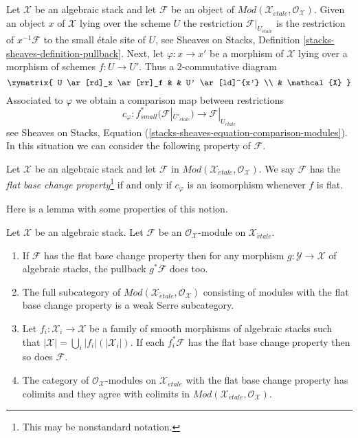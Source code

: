 \noindent
Let $\mathcal{X}$ be an algebraic stack and let $\mathcal{F}$ be an object
of $\textit{Mod}(\mathcal{X}_{\acute{e}tale}, \mathcal{O}_\mathcal{X})$.
Given an object $x$ of $\mathcal{X}$ lying over the scheme $U$ the
restriction $\mathcal{F}|_{U_{\acute{e}tale}}$ is the restriction of
$x^{-1}\mathcal{F}$ to the small \'etale site of $U$, see
Sheaves on Stacks, Definition \ref{stacks-sheaves-definition-pullback}.
Next, let $\varphi : x \to x'$ be a morphism of $\mathcal{X}$ lying
over a morphism of schemes $f : U \to U'$. Thus a $2$-commutative diagram
$$
\xymatrix{
U \ar[rd]_x \ar[rr]_f & & U' \ar[ld]^{x'} \\
& \mathcal{X}
}
$$
Associated to $\varphi$ we obtain a comparison map between restrictions
\begin{equation}
\label{equation-comparison-modules}
c_\varphi :
f_{small}^*(\mathcal{F}|_{U'_{\acute{e}tale}})
\longrightarrow
\mathcal{F}|_{U_{\acute{e}tale}}
\end{equation}
see Sheaves on Stacks, Equation
(\ref{stacks-sheaves-equation-comparison-modules}).
In this situation we can consider the following property
of $\mathcal{F}$.

\begin{definition}
\label{definition-flat-base-change}
Let $\mathcal{X}$ be an algebraic stack and let $\mathcal{F}$ in
$\textit{Mod}(\mathcal{X}_{\acute{e}tale}, \mathcal{O}_\mathcal{X})$.
We say $\mathcal{F}$ has the {\it flat base change property}\footnote{This
may be nonstandard notation.}
if and only if $c_\varphi$ is an isomorphism whenever $f$ is flat.
\end{definition}

\noindent
Here is a lemma with some properties of this notion.

\begin{lemma}
\label{lemma-check-flat-comparison-on-etale-covering}
Let $\mathcal{X}$ be an algebraic stack. Let $\mathcal{F}$
be an $\mathcal{O}_\mathcal{X}$-module on $\mathcal{X}_{\acute{e}tale}$.
\begin{enumerate}
\item If $\mathcal{F}$ has the flat base change property then for any morphism
$g : \mathcal{Y} \to \mathcal{X}$ of algebraic stacks, the
pullback $g^*\mathcal{F}$ does too.
\item The full subcategory of
$\textit{Mod}(\mathcal{X}_{\acute{e}tale}, \mathcal{O}_\mathcal{X})$
consisting of modules with the flat base change property
is a weak Serre subcategory.
\item  Let $f_i : \mathcal{X}_i \to \mathcal{X}$ be a family of
smooth morphisms of algebraic stacks such that
$|\mathcal{X}| = \bigcup_i |f_i|(|\mathcal{X}_i|)$. If each
$f_i^*\mathcal{F}$ has the flat base change property then so does
$\mathcal{F}$.
\item The category of $\mathcal{O}_\mathcal{X}$-modules
on $\mathcal{X}_{\acute{e}tale}$ with the flat base change property
has colimits and they agree with colimits in
$\textit{Mod}(\mathcal{X}_{\acute{e}tale}, \mathcal{O}_\mathcal{X})$.
\end{enumerate}
\end{lemma}

